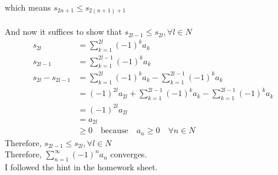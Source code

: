 \documentclass{article}
\begin{document}
which means \(s_{2n+1} \leq s_{2(n+1)+1}\) \\
\\
And now it suffices to show that \(s_{2l-1} \leq s_{2l}, \forall l \in N\)
\begin{align*}
   s_{2l} &= \sum_{k=1}^{2l} (-1)^k a_k \\
   s_{2l - 1} &= \sum_{k=1}^{2l-1} (-1)^k a_k \\
   s_{2l} - s_{2l-1} &= \sum_{k=1}^{2l} (-1)^k a_k - \sum_{k=1}^{2l-1} (-1)^k a_k \\
   &= (-1)^{2l} a_{2l} + \sum_{k=1}^{2l-1} (-1)^k a_k - \sum_{k=1}^{2l-1} (-1)^k a_k \\
   &= (-1)^{2l} a_{2l} \\
   &= a_{2l} \\
   &\geq 0 \quad \text{because} \quad a_n \geq 0 \quad \forall n \in N
\end{align*}
Therefore, \(s_{2l-1} \leq s_{2l}, \forall l \in N\) \\
Therefore, \(\sum_{n=1}^{\infty} (-1)^n a_n\) converges. \\
I followed the hint in the homework sheet. \\
\end{document}
